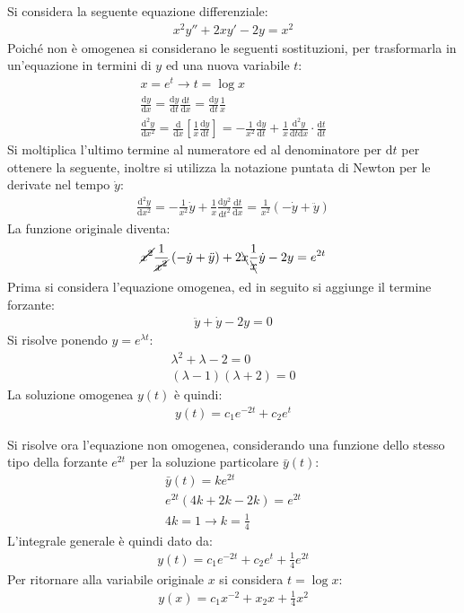 \documentclass{article}
\newcommand{\df}{\mathrm{d}}
\numberwithin{equation}{subsection}
\begin{document}
Si considera la seguente equazione differenziale:
\begin{gather*}
    x^2y''+2xy'-2y=x^2
\end{gather*}
Poiché non è omogenea si considerano le seguenti sostituzioni, per trasformarla in un'equazione in termini di $y$ ed una nuova variabile $t$:
\begin{gather*}
    x=e^t\to t=\log x\\
    \frac{\df y}{\df x}=\frac{\df y}{\df t}\frac{\df t}{\df x}=\frac{\df y}{\df t}\frac{1}{x}\\
    \frac{\df^2y}{\df x^2}=\frac{\df }{\df x}\left[\frac{1}{x}\frac{\df y}{\df t}\right]=-\frac{1}{x^2}\frac{\df y}{\df t}+\frac{1}{x}\frac{\df^2y}{\df t\df x}\cdot\frac{\df t}{\df t}
\end{gather*}
Si moltiplica l'ultimo termine al numeratore ed al denominatore per $\df t$ per ottenere la seguente, inoltre si utilizza la notazione puntata di Newton per le derivate nel tempo $\dot y$:
\begin{gather*}
    \frac{\df^2y}{\df x^2}=-\frac{1}{x^2}\dot{y}+\frac{1}{x}\frac{\df y^2}{\df t^2}\frac{\df t}{\df x}=\frac{1}{x^2}\left(-\dot y+\ddot y\right)
\end{gather*}
La funzione originale diventa:
\begin{gather*}
    \cancel{x^2}\frac{1}{\cancel{x^2}}\left(-\dot y+\ddot y\right)+2\bcancel{x}\frac{1}{\bcancel{x}}\dot y-2y=e^{2t}
\end{gather*}
Prima si considera l'equazione omogenea, ed in seguito si aggiunge il termine forzante:
\begin{gather*}
    \ddot y+\dot y-2y=0
\end{gather*}
Si risolve ponendo $y=e^{\lambda t}$:
\begin{gather*}
    \lambda^2 +\lambda-2=0\\
    (\lambda-1)(\lambda+2)=0
\end{gather*}
La soluzione omogenea $y(t)$ è quindi:
\begin{gather*}
    y(t)=c_1e^{-2t}+c_2e^{t}
\end{gather*}

Si risolve ora l'equazione non omogenea, considerando una funzione dello stesso tipo della forzante $e^{2t}$ per la soluzione particolare $\bar y(t)$:
\begin{gather*}
    \bar{y}(t)=ke^{2t}\\
    e^{2t}\left(4k+2k-2k\right)=e^{2t}\\
    4k=1\to k=\frac{1}{4}
\end{gather*}
L'integrale generale è quindi dato da:
\begin{gather*}
    y(t)=c_1e^{-2t}+c_2e^{t}+\frac{1}{4}e^{2t}
\end{gather*}
Per ritornare alla variabile originale $x$ si considera $t=\log x$:
\begin{gather*}
    y(x)=c_1x^{-2}+x_2x+\frac{1}{4}x^2
\end{gather*}
\end{document}
